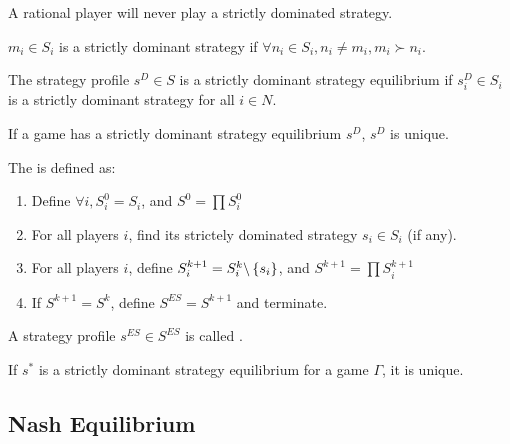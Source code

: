 \begin{theorem}
    A rational player will never play a strictly dominated strategy.    
\end{theorem}

\begin{definition}
    $m_i \in S_i$ is a strictly dominant strategy if $\forall n_i \in S_i, n_i \neq m_i, m_i \succ n_i$.
\end{definition}

\begin{definition}
    The strategy profile $s^D \in S$ is a strictly dominant strategy equilibrium if $s_i^D \in S_i$ is a strictly dominant strategy for all $i \in N$.
\end{definition}

\begin{theorem}
    If a game has a strictly dominant strategy equilibrium $s^D$,  $s^D$ is unique.
\end{theorem}

\begin{definition}
    The  is defined as:
    \begin{enumerate}
        \item Define $\forall i, S_i^0 = S_i$, and $S^0 = \prod S_i^0$
        \item For all players $i$, find its strictely dominated strategy $s_i \in S_i$ (if any).
        \item For all players $i$, define $S_i^{k+1} = S_i^k \backslash \set{s_i}$, and $S^{k+1} = \prod S_i^{k+1}$
        \item If $S^{k+1} = S^k$, define $S^{ES} = S^{k+1}$ and terminate.
    \end{enumerate}
    
    A strategy profile $s^{ES} \in S^{ES}$ is called .
\end{definition}

\begin{theorem}
    If $s^*$ is a strictly dominant strategy equilibrium for a game $\Gamma$, it is unique.
\end{theorem}


\subsection{Nash Equilibrium}

